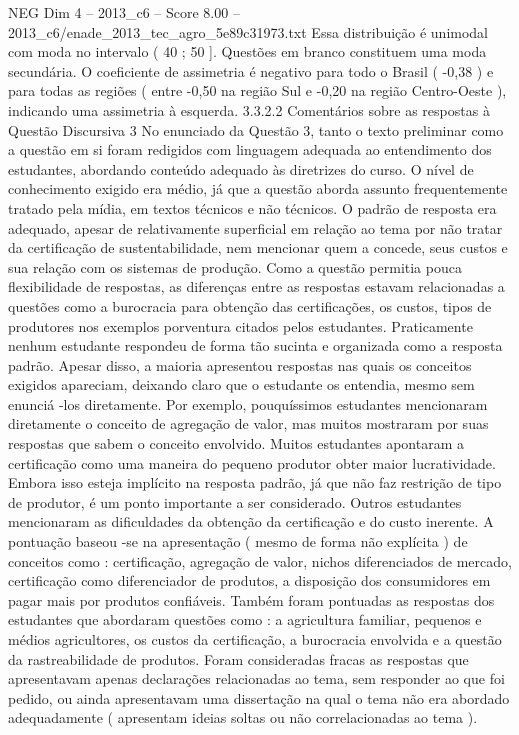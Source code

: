 \begin{textsample}{NEG Dim 4 – 2013\_c6 – Score 8.00 – 2013\_c6/enade\_2013\_tec\_agro\_5e89c31973.txt}
Essa distribuição é unimodal com moda no intervalo ( 40 ; 50 ].
Questões em branco constituem uma moda secundária.
O coeficiente de assimetria é negativo para todo o Brasil ( -0,38 ) e para todas as regiões ( entre -0,50 na região Sul e -0,20 na região Centro-Oeste ), indicando uma assimetria à esquerda. 3.3.2.2 Comentários sobre as respostas à Questão Discursiva 3 No enunciado da Questão 3, tanto o texto preliminar como a questão em si foram redigidos com linguagem adequada ao entendimento dos estudantes, abordando conteúdo adequado às diretrizes do curso.
O nível de conhecimento exigido era médio, já que a questão aborda assunto frequentemente tratado pela mídia, em textos técnicos e não técnicos.
O padrão de resposta era adequado, apesar de relativamente superficial em relação ao tema por não tratar da certificação de sustentabilidade, nem mencionar quem a concede, seus custos e sua relação com os sistemas de produção.
Como a questão permitia pouca flexibilidade de respostas, as diferenças entre as respostas estavam relacionadas a questões como a burocracia para obtenção das certificações, os custos, tipos de produtores nos exemplos porventura citados pelos estudantes.
Praticamente nenhum estudante respondeu de forma tão sucinta e organizada como a resposta padrão.
Apesar disso, a maioria apresentou respostas nas quais os conceitos exigidos apareciam, deixando claro que o estudante os entendia, mesmo sem enunciá -los diretamente.
Por exemplo, pouquíssimos estudantes mencionaram diretamente o conceito de agregação de valor, mas muitos mostraram por suas respostas que sabem o conceito envolvido.
Muitos estudantes apontaram a certificação como uma maneira do pequeno produtor obter maior lucratividade.
Embora isso esteja implícito na resposta padrão, já que não faz restrição de tipo de produtor, é um ponto importante a ser considerado.
Outros estudantes mencionaram as dificuldades da obtenção da certificação e do custo inerente.
A pontuação baseou -se na apresentação ( mesmo de forma não explícita ) de conceitos como : certificação, agregação de valor, nichos diferenciados de mercado, certificação como diferenciador de produtos, a disposição dos consumidores em pagar mais por produtos confiáveis.
Também foram pontuadas as respostas dos estudantes que abordaram questões como : a agricultura familiar, pequenos e médios agricultores, os custos da certificação, a burocracia envolvida e a questão da rastreabilidade de produtos.
Foram consideradas fracas as respostas que apresentavam apenas declarações relacionadas ao tema, sem responder ao que foi pedido, ou ainda apresentavam uma dissertação na qual o tema não era abordado adequadamente ( apresentam ideias soltas ou não correlacionadas ao tema ).

\end{textsample}
